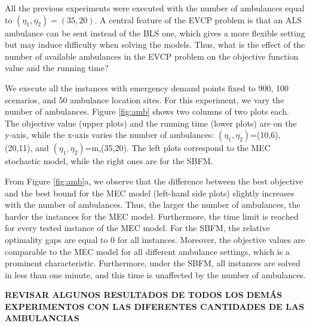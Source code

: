  All the previous experiments were executed with the number of ambulances equal to $(\eta_1,\eta_2)=   (35,20) $. A central feature of the EVCP problem is that an ALS ambulance can be sent instead of the BLS one, which gives a more flexible setting but may induce difficulty when solving the models. 
 Thus, what is the effect of the number of available ambulances in the EVCP problem on the objective function value and the running time?

  
 We execute all the instances with emergency demand points fixed to 900, 100 scenarios, and 50 ambulance location sites. For this experiment, we vary the number of ambulances. Figure \ref{fig:amb} shows two columns of two plots each. The objective value (upper plots) and the running time (lower plots) are on the y-axis, while the x-axis varies the number of ambulances: $(\eta_1,\eta_2)$=(10,6), (20,11), and  $(\eta_1,\eta_2)$=m,(35,20). The left plots correspond to the MEC stochastic model, while the right ones are for the SBFM. 

 From Figure \ref{fig:amb}a, we observe that the difference between the best objective and the best bound for the MEC model (left-hand side plots) slightly increases with the number of ambulances. Thus, the larger the number of ambulances, the harder the instances for the MEC model. Furthermore, the time limit is reached for every tested instance of the MEC model. For the SBFM, the relative optimality gaps are equal to 0 for all instances. Moreover, the objective values are comparable to the MEC model for all different ambulance settings, which is a prominent characteristic. Furthermore, under the SBFM, all instances are solved in less than one minute, and this time is unaffected by the number of ambulances.  

\textbf{REVISAR ALGUNOS RESULTADOS DE TODOS LOS DEMÁS EXPERIMENTOS CON LAS DIFERENTES CANTIDADES DE LAS AMBULANCIAS}



